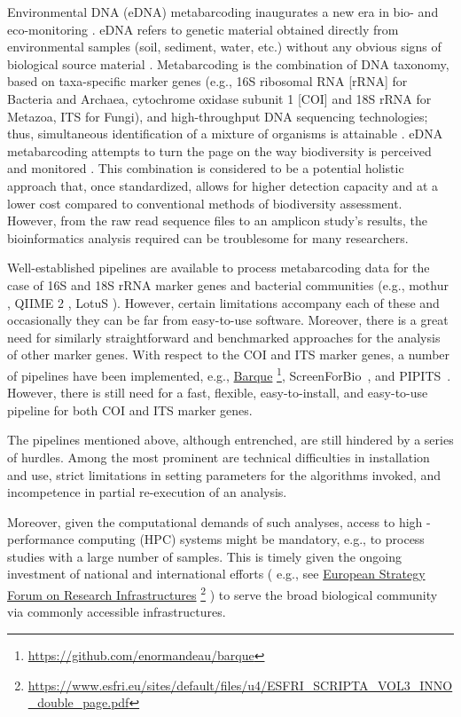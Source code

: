    Environmental DNA (eDNA) metabarcoding inaugurates a new era in bio- and eco-monitoring \cite{pavan2015dna}. 
   eDNA refers to genetic material obtained directly from environmental samples (soil, sediment, water, etc.) without any obvious signs of biological source material \cite{thomsen2015environmental}. 
   Metabarcoding is the combination of DNA taxonomy, based on taxa-specific marker genes (e.g., 16S ribosomal RNA [rRNA] for Bacteria and Archaea, cytochrome oxidase subunit 1 [COI] and 18S rRNA for Metazoa, ITS for Fungi), and high-throughput DNA sequencing technologies; thus, simultaneous identification of a mixture of organisms is attainable \cite{ji2013reliable}. 
   eDNA metabarcoding attempts to turn the page on the way biodiversity is perceived and monitored \cite{ji2013reliable}. 
   This combination is considered to be a potential holistic approach that, once standardized, allows for higher detection capacity and at a lower cost compared to conventional methods of biodiversity assessment. 
   However, from the raw read sequence files to an amplicon study's results, the bioinformatics analysis required can be troublesome for many researchers.

   Well-established pipelines are available to process metabarcoding data for the case of 16S and 18S rRNA marker genes and bacterial communities (e.g., mothur \cite{schloss2009introducing}, QIIME 2 \cite{bolyen2018qiime}, LotuS \cite{hildebrand2014lotus}). 
   However, certain limitations accompany each of these and occasionally they can be far from easy-to-use software. Moreover, there is a great need for similarly straightforward and benchmarked approaches for the analysis of other marker genes. With respect to the COI and ITS marker genes, a number of pipelines have been implemented, e.g., 
   \href{https://github.com/enormandeau/barque}{Barque} 
   \footnote{
      \href{https://github.com/enormandeau/barque}{https://github.com/enormandeau/barque}
   }, 
   ScreenForBio~\cite{axtner2019efficient}, and PIPITS~\cite{gweon2015pipits}. 
   However, there is still need for a fast, flexible, easy-to-install, and easy-to-use pipeline for both COI and ITS marker genes.
   
   The pipelines mentioned above, although entrenched, are still hindered by a series of hurdles. 
   Among the most prominent are technical difficulties in installation and use, strict limitations in setting parameters for the algorithms invoked, and incompetence in partial re-execution of an analysis.
   
   Moreover, given the computational demands of such analyses, access to high - performance computing (HPC) systems might be mandatory, e.g., to process studies with a large number of samples. 
   This is timely given the ongoing investment of national and international efforts (
   e.g., see 
   \href{https://www.esfri.eu/sites/default/files/u4/ESFRI_SCRIPTA_VOL3_INNO_double_page.pdf}{European Strategy Forum on Research Infrastructures} \footnote{
      \href{https://www.esfri.eu/sites/default/files/u4/ESFRI_SCRIPTA_VOL3_INNO_double_page.pdf}{https://www.esfri.eu/sites/default/files/u4/ESFRI\_SCRIPTA\_VOL3\_INNO\_double\_page.pdf}
   }
   ) 
   to serve the broad biological community via commonly accessible infrastructures.
   
